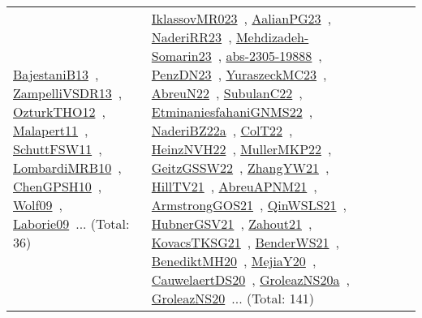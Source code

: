 {\begin{longtable}{lp{3cm}>{\raggedright\arraybackslash}p{6cm}>{\raggedright\arraybackslash}p{6cm}>{\raggedright\arraybackslash}p{8cm}}
\href{../works/BajestaniB13.pdf}{BajestaniB13}~\cite{BajestaniB13}, \href{../works/ZampelliVSDR13.pdf}{ZampelliVSDR13}~\cite{ZampelliVSDR13}, \href{../works/OzturkTHO12.pdf}{OzturkTHO12}~\cite{OzturkTHO12}, \href{../works/Malapert11.pdf}{Malapert11}~\cite{Malapert11}, \href{../works/SchuttFSW11.pdf}{SchuttFSW11}~\cite{SchuttFSW11}, \href{../works/LombardiMRB10.pdf}{LombardiMRB10}~\cite{LombardiMRB10}, \href{../works/ChenGPSH10.pdf}{ChenGPSH10}~\cite{ChenGPSH10}, \href{../works/Wolf09.pdf}{Wolf09}~\cite{Wolf09}, \href{../works/Laborie09.pdf}{Laborie09}~\cite{Laborie09}... (Total: 36) & \href{../works/IklassovMR023.pdf}{IklassovMR023}~\cite{IklassovMR023}, \href{../works/AalianPG23.pdf}{AalianPG23}~\cite{AalianPG23}, \href{../works/NaderiRR23.pdf}{NaderiRR23}~\cite{NaderiRR23}, \href{../works/Mehdizadeh-Somarin23.pdf}{Mehdizadeh-Somarin23}~\cite{Mehdizadeh-Somarin23}, \href{../works/abs-2305-19888.pdf}{abs-2305-19888}~\cite{abs-2305-19888}, \href{../works/PenzDN23.pdf}{PenzDN23}~\cite{PenzDN23}, \href{../works/YuraszeckMC23.pdf}{YuraszeckMC23}~\cite{YuraszeckMC23}, \href{../works/AbreuN22.pdf}{AbreuN22}~\cite{AbreuN22}, \href{../works/SubulanC22.pdf}{SubulanC22}~\cite{SubulanC22}, \href{../works/EtminaniesfahaniGNMS22.pdf}{EtminaniesfahaniGNMS22}~\cite{EtminaniesfahaniGNMS22}, \href{../works/NaderiBZ22a.pdf}{NaderiBZ22a}~\cite{NaderiBZ22a}, \href{../works/ColT22.pdf}{ColT22}~\cite{ColT22}, \href{../works/HeinzNVH22.pdf}{HeinzNVH22}~\cite{HeinzNVH22}, \href{../works/MullerMKP22.pdf}{MullerMKP22}~\cite{MullerMKP22}, \href{../works/GeitzGSSW22.pdf}{GeitzGSSW22}~\cite{GeitzGSSW22}, \href{../works/ZhangYW21.pdf}{ZhangYW21}~\cite{ZhangYW21}, \href{../works/HillTV21.pdf}{HillTV21}~\cite{HillTV21}, \href{../works/AbreuAPNM21.pdf}{AbreuAPNM21}~\cite{AbreuAPNM21}, \href{../works/ArmstrongGOS21.pdf}{ArmstrongGOS21}~\cite{ArmstrongGOS21}, \href{../works/QinWSLS21.pdf}{QinWSLS21}~\cite{QinWSLS21}, \href{../works/HubnerGSV21.pdf}{HubnerGSV21}~\cite{HubnerGSV21}, \href{../works/Zahout21.pdf}{Zahout21}~\cite{Zahout21}, \href{../works/KovacsTKSG21.pdf}{KovacsTKSG21}~\cite{KovacsTKSG21}, \href{../works/BenderWS21.pdf}{BenderWS21}~\cite{BenderWS21}, \href{../works/BenediktMH20.pdf}{BenediktMH20}~\cite{BenediktMH20}, \href{../works/MejiaY20.pdf}{MejiaY20}~\cite{MejiaY20}, \href{../works/CauwelaertDS20.pdf}{CauwelaertDS20}~\cite{CauwelaertDS20}, \href{../works/GroleazNS20a.pdf}{GroleazNS20a}~\cite{GroleazNS20a}, \href{../works/GroleazNS20.pdf}{GroleazNS20}~\cite{GroleazNS20}... (Total: 141)\\

\end{longtable}}
